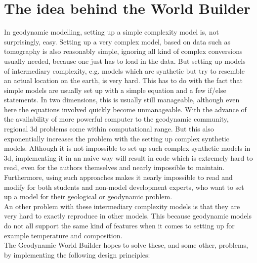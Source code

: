 \documentclass{book}
\newcommand{\GWB}{{Geodynamic World Builder}}
\begin{document}
\section{The idea behind the World Builder}
\label{section:idea_behind_WB}
In geodynamic modelling, setting up a simple complexity model is, not surprisingly, easy. Setting up a very complex model, based on data such as tomography is also reasonably simple, ignoring all kind of complex conversions usually needed, because one just has to load in the data. But setting up models of intermediary complexity, e.g. models which are synthetic but try to resemble an actual location on the earth, is very hard. This has to do with the fact that simple models are usually set up with a simple equation and a few if/else statements. In two dimensions, this is usually still manageable, although even here the equations involved quickly become unmanageable. With the advance of the availability of more powerful computer to the geodynamic community, regional 3d problems come within computational range. But this also exponentially increases the problem with the setting up complex synthetic models. Although it is not impossible to set up such complex synthetic models in 3d, implementing it in an naive way will result in code which is extremely hard to read, even for the authors themselves and nearly impossible to maintain. Furthermore, using such approaches makes it nearly impossible to read and modify for both students and non-model development experts, who want to set up a model for their geological or geodynamic problem. 
\\ 
An other problem with these intermediary complexity models is that they are very hard to exactly reproduce in other models. This because geodynamic models do not all support the same kind of features when it comes to setting up for example temperature and composition. 
\\
The \GWB{} hopes to solve these, and some other, problems, by implementing the following design principles:
\\
\end{document}
